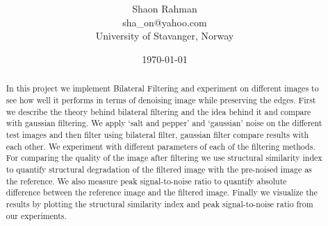\documentclass[a4paper, english]{article}
\title{\spacecaps{Noise reduction using bilateral filtering}\\ \normalsize \spacesc{Edge Preserved Image Smoothing} }
\author{Shaon Rahman\\sha\_on@yahoo.com\\University of Stavanger, Norway}
\date{\today}
\begin{document}
\renewcommand{\abstractname}{Summary}
\maketitle
\begin{abstract}
%
In this project we implement Bilateral Filtering\cite{710815} and experiment on different images to see how well it performs in terms of denoising image while preserving the edges. First we describe the theory behind bilateral filtering and the idea behind it and compare with gaussian filtering. We apply `salt and pepper' and `gaussian' noise on the different test images and then filter using bilateral filter, gaussian filter\cite{wiki:gaussianfilter} compare results with each other. We experiment with different parameters of each of the filtering methods. For comparing the quality of the image after filtering we use structural similarity index\cite{wang2003ssim} to quantify structural degradation of the filtered image with the pre-noised image as the reference. We also measure peak signal-to-noise\cite{poobathy2014edge} ratio to quantify absolute difference between the reference image and the filtered image. Finally we visualize the results by plotting the structural similarity index and peak signal-to-noise ratio from our experiments.

%
\end{abstract}
\end{document}
